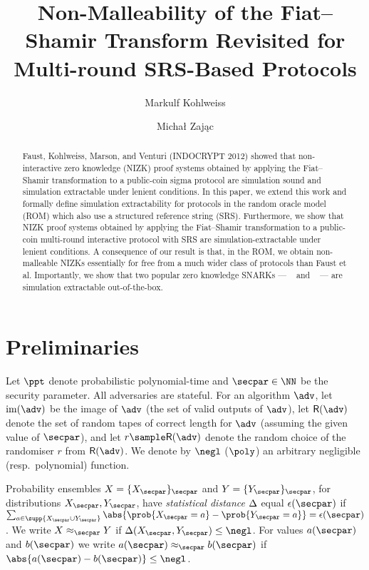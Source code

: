 \documentclass[runningheads,11pt]{llncs}
\title{Non-Malleability of the Fiat--Shamir Transform Revisited for Multi-round SRS-Based Protocols}
\author{Markulf Kohlweiss\inst{1,2} \and Michał Zając\inst{3}}
\institute{University of Edinburgh, Edinburgh, UK \and IOHK \\
\email{mkohlwei@inf.ed.ac.uk} \and Clearmatics, London, UK \\
\email{m.p.zajac@gmail.com}}
\begin{document}
 \sloppy
{}
\maketitle

\begin{abstract}
  Faust, Kohlweiss, Marson, and Venturi (INDOCRYPT 2012) showed that
  non-interactive zero knowledge (NIZK) proof systems obtained by applying the
  Fiat--Shamir transformation to a public-coin sigma protocol are simulation
  sound and simulation extractable under lenient conditions. In this paper, we
  extend this work and formally define simulation extractability for protocols
  in the random oracle model (ROM) which also use a structured reference string
  (SRS). Furthermore, we show that NIZK proof systems obtained by applying the
  Fiat--Shamir transformation to a public-coin multi-round interactive protocol
  with SRS are simulation-extractable under lenient conditions. A consequence of
  our result is that, in the ROM, we obtain non-malleable NIZKs essentially for
  free from a much wider class of protocols than Faust et al. Importantly, we
  show that two popular zero knowledge SNARKs ---
  \plonk{}~\cite{EPRINT:GabWilCio19} and \sonic{}~\cite{CCS:MBKM19} --- are
  simulation extractable out-of-the-box.
\end{abstract}





\section{Preliminaries}
\label{sec:preliminaries}
Let $\ppt$ denote probabilistic polynomial-time and $\secpar \in \NN$ be the
security parameter. All adversaries are stateful. For an algorithm $\adv$, let
$\image (\adv)$ be the image of $\adv$ (the set of valid outputs of $\adv$), let
$\RND{\adv}$ denote the set of random tapes of correct length for $\adv$
(assuming the given value of $\secpar$), and let $r \sample \RND{\adv}$ denote
the random choice of the randomiser $r$ from $\RND{\adv}$. We denote by $\negl$
($\poly$) an arbitrary negligible (resp.~polynomial) function.

Probability ensembles $X = \smallset{X_\secpar}_\secpar$ and $Y =
\smallset{Y_\secpar}_\secpar$, for distributions $X_\secpar, Y_\secpar$, have
\emph{statistical distance} $\Delta$ equal $\epsilon(\secpar)$ if $\sum_{a \in
  \supp{X_\secpar \cup Y_\secpar}} \abs{\prob{X_\secpar = a} - \prob{Y_\secpar =
    a}} = \epsilon(\secpar)$. We write $X \approx_\secpar Y$ if $\SD(X_\secpar,
Y_\secpar) \leq \negl$. For values $a(\secpar)$ and $b(\secpar)$ we write
$a(\secpar) \approx_\secpar b(\secpar)$ if $\abs{a(\secpar) - b(\secpar)} \leq
\negl$.
\end{document}
